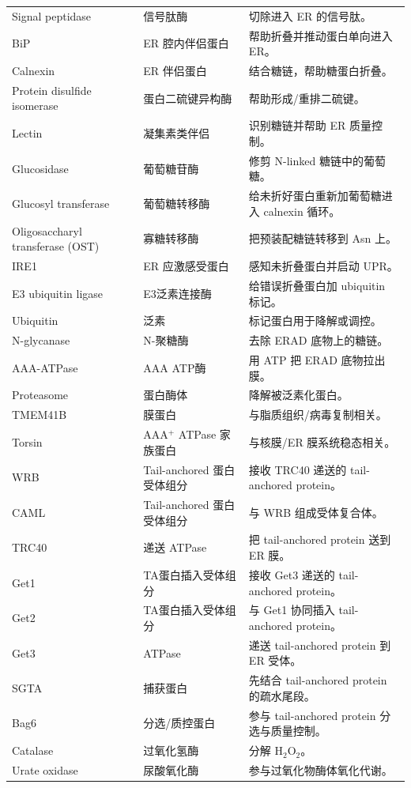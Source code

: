 \documentclass[11pt,fontset=none]{ctexart}
\begin{document}
\begin{longtable}{L{3.2cm} L{3.8cm} L{8.5cm}}
Signal peptidase & 信号肽酶 & 切除进入 ER 的信号肽。 \\
BiP & ER 腔内伴侣蛋白 & 帮助折叠并推动蛋白单向进入 ER。 \\
Calnexin & ER 伴侣蛋白 & 结合糖链，帮助糖蛋白折叠。 \\
Protein disulfide isomerase & 蛋白二硫键异构酶 & 帮助形成/重排二硫键。 \\
Lectin & 凝集素类伴侣 & 识别糖链并帮助 ER 质量控制。 \\
Glucosidase & 葡萄糖苷酶 & 修剪 N-linked 糖链中的葡萄糖。 \\
Glucosyl transferase & 葡萄糖转移酶 & 给未折好蛋白重新加葡萄糖进入 calnexin 循环。 \\
Oligosaccharyl transferase (OST) & 寡糖转移酶 & 把预装配糖链转移到 Asn 上。 \\
IRE1 & ER 应激感受蛋白 & 感知未折叠蛋白并启动 UPR。 \\
E3 ubiquitin ligase & E3泛素连接酶 & 给错误折叠蛋白加 ubiquitin 标记。 \\
Ubiquitin & 泛素 & 标记蛋白用于降解或调控。 \\
N-glycanase & N-聚糖酶 & 去除 ERAD 底物上的糖链。 \\
AAA-ATPase & AAA ATP酶 & 用 ATP 把 ERAD 底物拉出膜。 \\
Proteasome & 蛋白酶体 & 降解被泛素化蛋白。 \\
TMEM41B & 膜蛋白 & 与脂质组织/病毒复制相关。 \\
Torsin & AAA$^+$ ATPase 家族蛋白 & 与核膜/ER 膜系统稳态相关。 \\
WRB & Tail-anchored 蛋白受体组分 & 接收 TRC40 递送的 tail-anchored protein。 \\
CAML & Tail-anchored 蛋白受体组分 & 与 WRB 组成受体复合体。 \\
TRC40 & 递送 ATPase & 把 tail-anchored protein 送到 ER 膜。 \\
Get1 & TA蛋白插入受体组分 & 接收 Get3 递送的 tail-anchored protein。 \\
Get2 & TA蛋白插入受体组分 & 与 Get1 协同插入 tail-anchored protein。 \\
Get3 & ATPase & 递送 tail-anchored protein 到 ER 受体。 \\
SGTA & 捕获蛋白 & 先结合 tail-anchored protein 的疏水尾段。 \\
Bag6 & 分选/质控蛋白 & 参与 tail-anchored protein 分选与质量控制。 \\
Catalase & 过氧化氢酶 & 分解 H$_2$O$_2$。 \\
Urate oxidase & 尿酸氧化酶 & 参与过氧化物酶体氧化代谢。 \\
\end{longtable}
\end{document}
